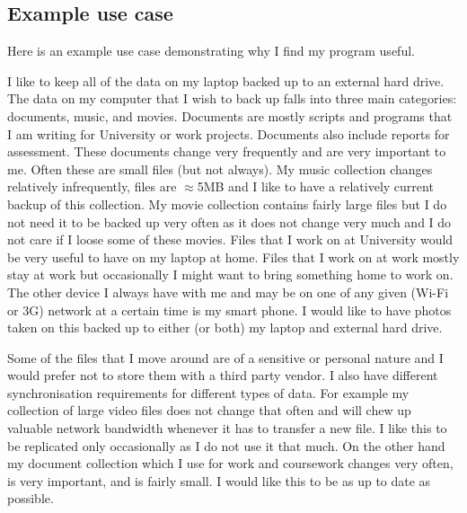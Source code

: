 \documentclass[12pt]{article}
\begin{document}


\subsection{Example use case}
Here is an example use case demonstrating why I find my program useful.

I like to keep all of the data on my laptop backed up to an
external hard drive. The data on my computer that I wish
to back up falls into three main categories: documents, music, and movies.
Documents are mostly scripts and programs that I am writing for
University or work projects. Documents also include reports for
assessment. These documents change very frequently and are very important
to me. Often these are small files (but not always). My music collection
changes relatively infrequently, files are $\approx$5MB and I like to
have a relatively current backup of this collection. My movie collection
contains fairly large files but I do not need it to be backed up very often
as it does not change very much and I do not care if I loose some of these
movies. Files that I work on at University would be very useful to have
on my laptop at home. Files that I work on at work mostly stay at work
but occasionally I might want to bring something home to work on.
The other device I always have with me and may be on one of any given
(Wi-Fi or 3G) network at a certain time is my smart phone. I would like
to have photos taken on this backed up to either (or both) my laptop and
external hard drive. 

Some of the files that I move around are of a sensitive or personal nature
and I would prefer not to store them with a third party vendor.
I also have different synchronisation requirements for different
types of data. 
For example my collection of large video files does not change that often
and will chew up valuable network bandwidth whenever it has to transfer
a new file. I like this to be replicated only occasionally as I do not
use it that much. On the other hand my document collection which I use
for work and coursework changes very often, is very important, and
is fairly small. I would like this to be as up to date as possible.
\end{document}

